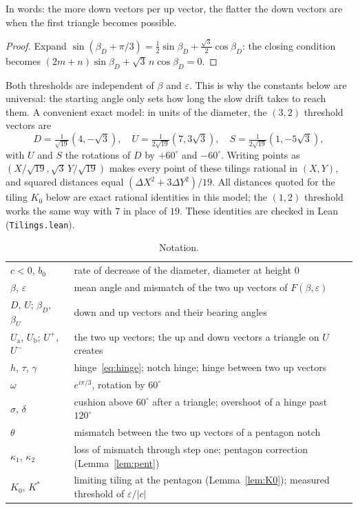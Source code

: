 \documentclass[11pt]{amsart}
\theoremstyle{definition}
\newcommand{\eps}{\varepsilon}
\newcommand{\Ua}{U_{\mathrm a}}
\newcommand{\Ub}{U_{\mathrm b}}
\newcommand{\lean}[1]{\texttt{#1}}
\begin{document}
\noindent In words: the more down vectors per up vector, the flatter the down vectors are when the
first triangle becomes possible.

\begin{proof}
Expand $\sin(\beta_D+\pi/3)=\tfrac12\sin\beta_D+\tfrac{\sqrt3}2\cos\beta_D$: the closing condition
becomes $(2m+n)\sin\beta_D+\sqrt3\,n\cos\beta_D=0$.
\end{proof}

Both thresholds are independent of $\beta$ and $\eps$. This is why the constants below are universal:
the starting angle only sets how long the slow drift takes to reach them. A convenient exact model:
in units of the diameter, the $(3,2)$ threshold vectors are
\begin{equation}\label{eq:K0vectors}
D=\tfrac{1}{\sqrt{19}}(4,-\sqrt3),\quad U=\tfrac{1}{2\sqrt{19}}(7,3\sqrt3),\quad
S=\tfrac{1}{2\sqrt{19}}(1,-5\sqrt3),
\end{equation}
with $U$ and $S$ the rotations of $D$ by $+60^\circ$ and $-60^\circ$. Writing points as
$(X/\sqrt{19},\sqrt3\,Y/\sqrt{19})$ makes every point of these tilings rational in $(X,Y)$, and
squared distances equal $(\Delta X^2+3\Delta Y^2)/19$. All distances quoted for the tiling $K_0$ below
are exact rational identities in this model; the $(1,2)$ threshold works the same way with $7$ in place
of $19$. These identities are checked in Lean (\lean{Tilings.lean}).

\begin{table}[h]
\centering\small
\begin{tabular}{@{}ll@{}}
\toprule
$c<0$, $b_0$ & rate of decrease of the diameter, diameter at height $0$\\
$\beta$, $\eps$ & mean angle and mismatch of the two up vectors of $F(\beta,\eps)$\\
$D$, $U$; $\beta_D$, $\beta_U$ & down and up vectors and their bearing angles\\
$\Ua$, $\Ub$; $U^{+}$, $U^{-}$ & the two up vectors; the up and down vectors a triangle on $U$ creates\\
$h$, $\tau$, $\gamma$ & hinge~\eqref{eq:hinge}; notch hinge; hinge between two up vectors\\
$\omega$ & $e^{i\pi/3}$, rotation by $60^\circ$\\
$\sigma$, $\delta$ & cushion above $60^\circ$ after a triangle; overshoot of a hinge past $120^\circ$\\
$\theta$ & mismatch between the two up vectors of a pentagon notch\\
$\kappa_1$, $\kappa_2$ & loss of mismatch through step one; pentagon correction (Lemma~\ref{lem:pent})\\
$K_0$, $K^*$ & limiting tiling at the pentagon (Lemma~\ref{lem:K0}); measured threshold of $\eps/|c|$\\
\bottomrule
\end{tabular}
\caption{Notation.}\label{tab:notation}
\end{table}
\end{document}
